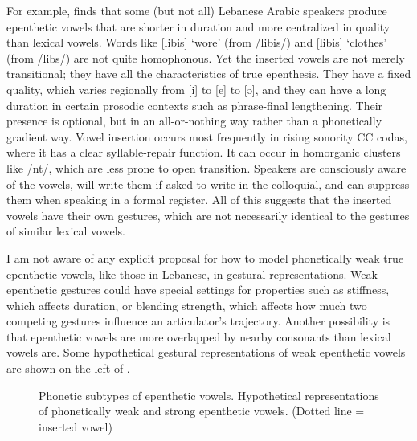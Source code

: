 \documentclass[output=paper,colorlinks,citecolor=brown]{langscibook}
\begin{document}
For example, \citet{hall2013acoustic} finds that some (but not all) Lebanese Arabic speakers produce epenthetic vowels that are shorter in duration and more centralized in quality than lexical vowels. Words like [libis] ‘wore’ (from /libis/) and [libis] ‘clothes’ (from /libs/) are not quite homophonous. Yet the inserted vowels are not merely transitional; they have all the characteristics of true epenthesis. They have a fixed quality, which varies regionally from [i] to [e] to [ə], and they can have a long duration in certain prosodic contexts such as phrase\hyp final lengthening. Their presence is optional, but in an all-or-nothing way rather than a phonetically gradient way. Vowel insertion occurs most frequently in rising sonority CC codas, where it has a clear syllable-repair function. It can occur in homorganic clusters like /nt/, which are less prone to open transition. Speakers are consciously aware of the vowels, will write them if asked to write in the colloquial, and can suppress them when speaking in a formal register. All of this suggests that the inserted vowels have their own gestures, which are not necessarily identical to the gestures of similar lexical vowels. 

I am not aware of any explicit proposal for how to model phonetically weak true epenthetic vowels, like those in Lebanese, in gestural representations. Weak epenthetic gestures could have special settings for properties such as stiffness, which affects duration, or blending strength, which affects how much two competing gestures influence an articulator’s trajectory. Another possibility is that epenthetic vowels are more overlapped by nearby consonants than lexical vowels are. Some hypothetical gestural representations of weak epenthetic vowels are shown on the left of . 


\begin{figure}
\caption{Phonetic subtypes of epenthetic vowels. Hypothetical representations of phonetically weak and strong epenthetic vowels. (Dotted line = inserted vowel)}



\label{fig3}
\end{figure}
\end{document}
